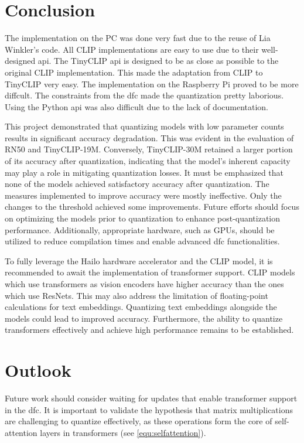 \section{Conclusion}
The implementation on the PC was done very fast due to the reuse of Lia Winkler's code.
All CLIP implementations are easy to use due to their well-designed \acrshort{api}.
The TinyCLIP \acrshort{api} is designed to be as close as possible to the original CLIP implementation.
This made the adaptation from CLIP to TinyCLIP very easy.
The implementation on the Raspberry Pi proved to be more diffcult.
The constraints from the \acrshort{dfc} made the quantization pretty laborious.
Using the Python \acrshort{api} was also difficult due to the lack of documentation.

This project demonstrated that quantizing models with low parameter counts results in significant accuracy degradation.
This was evident in the evaluation of RN50 and TinyCLIP-19M.  
Conversely, TinyCLIP-30M retained a larger portion of its accuracy after quantization, indicating that the model's inherent capacity may play a role in mitigating quantization losses.  
It must be emphasized that none of the models achieved satisfactory accuracy after quantization.  
The measures implemented to improve accuracy were mostly ineffective.
Only the changes to the threshold achieved some improvements. 
Future efforts should focus on optimizing the models prior to quantization to enhance post-quantization performance.  
Additionally, appropriate hardware, such as GPUs, should be utilized to reduce compilation times and enable advanced \acrshort{dfc} functionalities.  

To fully leverage the Hailo hardware accelerator and the CLIP model, it is recommended to await the implementation of transformer support.
CLIP models which use transformers as vision encoders have higher accuracy than the ones which use ResNets. 
This may also address the limitation of floating-point calculations for text embeddings.  
Quantizing text embeddings alongside the models could lead to improved accuracy.  
Furthermore, the ability to quantize transformers effectively and achieve high performance remains to be established.  

\section{Outlook}  
Future work should consider waiting for updates that enable transformer support in the \acrshort{dfc}.  
It is important to validate the hypothesis that matrix multiplications are challenging to quantize effectively, as these operations form the core of self-attention layers in transformers (see \cref{equ:selfattention}).  

